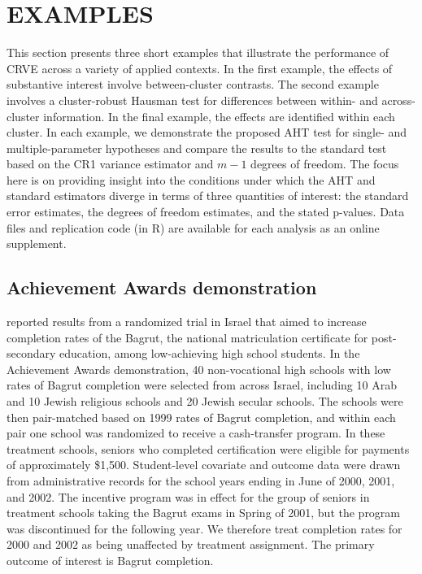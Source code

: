 \documentclass[12pt]{article}\usepackage[]{graphicx}\usepackage[]{color}
\begin{document}
\section{EXAMPLES}
\label{sec:examples}

This section presents three short examples that illustrate the performance of CRVE across a variety of applied contexts. 
In the first example, the effects of substantive interest involve between-cluster contrasts. 
The second example involves a cluster-robust Hausman test for differences between within- and across-cluster information. 
In the final example, the effects are identified within each cluster. 
In each example, we demonstrate the proposed AHT test for single- and multiple-parameter hypotheses and compare the results to the standard test based on the CR1 variance estimator and $m - 1$ degrees of freedom. 
The focus here is on providing insight into the conditions under which the AHT and standard estimators diverge in terms of three quantities of interest: the standard error estimates, the degrees of freedom estimates, and the stated p-values. 
Data files and replication code (in R) are available for each analysis as an online supplement.

\subsection{Achievement Awards demonstration} 

\citet{Angrist2009effects} reported results from a randomized trial in Israel that aimed to increase completion rates of the Bagrut, the national matriculation certificate for post-secondary education, among low-achieving high school students. 
In the Achievement Awards demonstration, 40 non-vocational high schools with low rates of Bagrut completion were selected from across Israel, including 10 Arab and 10 Jewish religious schools and 20 Jewish secular schools. 
The schools were then pair-matched based on 1999 rates of Bagrut completion, and within each pair one school was randomized to receive a cash-transfer program. 
In these treatment schools, seniors who completed certification were eligible for payments of approximately \$1,500. 
Student-level covariate and outcome data were drawn from administrative records for the school years ending in June of 2000, 2001, and 2002. 
The incentive program was in effect for the group of seniors in treatment schools taking the Bagrut exams in Spring of 2001, but the program was discontinued for the following year. 
We therefore treat completion rates for 2000 and 2002 as being unaffected by treatment assignment.
The primary outcome of interest is Bagrut completion. 
\end{document}
